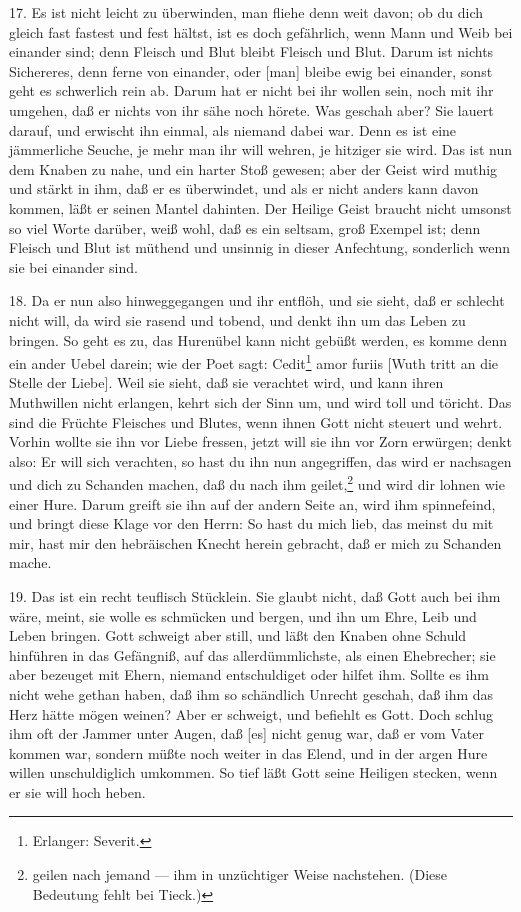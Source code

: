 17. Es ist nicht leicht zu überwinden, man fliehe denn weit davon; ob du dich gleich fast fastest und fest hältst, ist es doch gefährlich, wenn Mann und Weib bei einander sind; denn Fleisch und Blut bleibt Fleisch und Blut. Darum ist nichts Sichereres, denn ferne von einander, oder [man] bleibe ewig bei einander, sonst geht es schwerlich rein ab. Darum hat er nicht bei ihr wollen sein, noch mit ihr umgehen, daß er nichts von ihr sähe noch hörete. Was geschah aber? Sie lauert darauf, und erwischt ihn einmal, als niemand dabei war. Denn es ist eine jämmerliche Seuche, je mehr man ihr will wehren, je hitziger sie wird. Das ist nun dem Knaben zu nahe, und ein harter Stoß gewesen; aber der Geist wird muthig und stärkt in ihm, daß er es überwindet, und als er nicht anders kann davon kommen, läßt er seinen Mantel dahinten. Der Heilige Geist braucht nicht umsonst so viel Worte darüber, weiß wohl, daß es ein seltsam, groß Exempel ist; denn Fleisch und Blut ist müthend und unsinnig in dieser Anfechtung, sonderlich wenn sie bei einander sind.

18. Da er nun also hinweggegangen und ihr entflöh, und sie sieht, daß er schlecht nicht will, da wird sie rasend und tobend, und denkt ihn um das Leben zu bringen. So geht es zu, das Hurenübel kann nicht gebüßt werden, es komme denn ein ander Uebel darein; wie der Poet sagt: Cedit\footnote{Erlanger: Severit.} amor furiis [Wuth tritt an die Stelle der Liebe]. Weil sie sieht, daß sie verachtet wird, und kann ihren Muthwillen nicht erlangen, kehrt sich der Sinn um, und wird toll und töricht. Das sind die Früchte Fleisches und Blutes, wenn ihnen Gott nicht steuert und wehrt. Vorhin wollte sie ihn vor Liebe fressen, jetzt will sie ihn vor Zorn erwürgen; denkt also: Er will sich verachten, so hast du ihn nun angegriffen, das wird er nachsagen und dich zu Schanden machen, daß du nach ihm geilet,\footnote{geilen nach jemand — ihm in unzüchtiger Weise nachstehen. (Diese Bedeutung fehlt bei Tieck.)} und wird dir lohnen wie einer Hure. Darum greift sie ihn auf der andern Seite an, wird ihm spinnefeind, und bringt diese Klage vor den Herrn: So hast du mich lieb, das meinst du mit mir, hast mir den hebräischen Knecht herein gebracht, daß er mich zu Schanden mache.

19. Das ist ein recht teuflisch Stücklein. Sie glaubt nicht, daß Gott auch bei ihm wäre, meint, sie wolle es schmücken und bergen, und ihn um Ehre, Leib und Leben bringen. Gott schweigt aber still, und läßt den Knaben ohne Schuld hinführen in das Gefängniß, auf das allerdümmlichste, als einen Ehebrecher; sie aber bezeuget mit Ehern, niemand entschuldiget oder hilfet ihm. Sollte es ihm nicht wehe gethan haben, daß ihm so schändlich Unrecht geschah, daß ihm das Herz hätte mögen weinen? Aber er schweigt, und befiehlt es Gott. Doch schlug ihm oft der Jammer unter Augen, daß [es] nicht genug war, daß er vom Vater kommen war, sondern müßte noch weiter in das Elend, und in der argen Hure willen unschuldiglich umkommen. So tief läßt Gott seine Heiligen stecken, wenn er sie will hoch heben.

